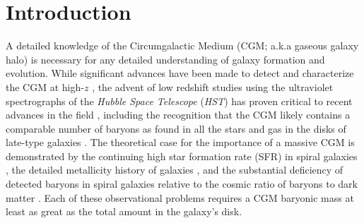 \documentclass[twocolumn,twocolappendix,tighten,times]{aastex6}
\newcommand{\hst}{{\sl HST}}
\begin{document}
\maketitle


\section{Introduction}
\label{intro} 

A detailed knowledge of the Circumgalactic Medium (CGM; a.k.a gaseous
galaxy halo) is necessary for any detailed understanding of galaxy
formation and evolution. While significant advances have been made to
detect and characterize the CGM at high-$z$ \citep[e.g.,][]{steidel95, 
adelberger05, rudie13}, the advent of low redshift studies using the
ultraviolet spectrographs of the {\sl Hubble Space Telescope} (\hst) has
proven critical to recent advances in the field \citep*{tripp98, 
penton04,tumlinson11,prochaska11a,stocke13,werk13,lehner15,bowen16,werk16}, 
including the recognition that the CGM likely contains a comparable number 
of baryons as found in all the stars and gas in the disks of late-type
galaxies \citep{tumlinson11, stocke13, werk14}. The theoretical case
for the importance of a massive CGM is demonstrated by the continuing
high star formation rate (SFR) in spiral galaxies \citep{binney87, 
chomiuk11}, the detailed metallicity history of galaxies
\citep*[e.g., the ``G dwarf problem'';][]{larson72, binney87, 
chiappini01}, and the substantial deficiency of detected baryons in
spiral galaxies relative to the cosmic ratio of baryons to dark matter
\citep[e.g.,][]{mcgaugh00, klypin01}. Each of these observational
problems requires a CGM baryonic mass at least as great as the total
amount in the galaxy's disk. 
\end{document}
